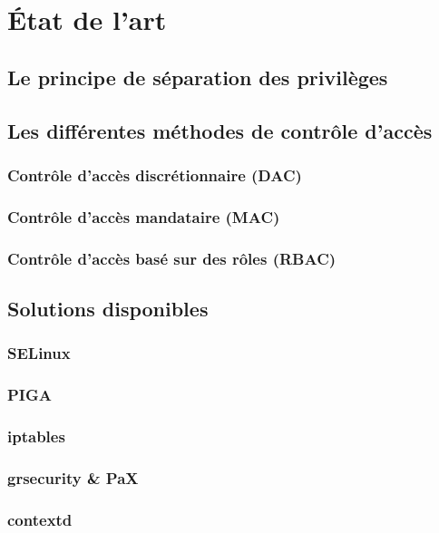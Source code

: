 \section{\'Etat de l'art}

\subsection{Le principe de séparation des privilèges}

\subsection{Les différentes méthodes de contrôle d'accès}

\subsubsection{Contrôle d'accès discrétionnaire (DAC)}

\subsubsection{Contrôle d'accès mandataire (MAC)}

\subsubsection{Contrôle d'accès basé sur des rôles (RBAC)}

\subsection{Solutions disponibles}

\subsubsection{SELinux}

\subsubsection{PIGA}

\subsubsection{iptables}

\subsubsection{grsecurity \& PaX}

\subsubsection{contextd}